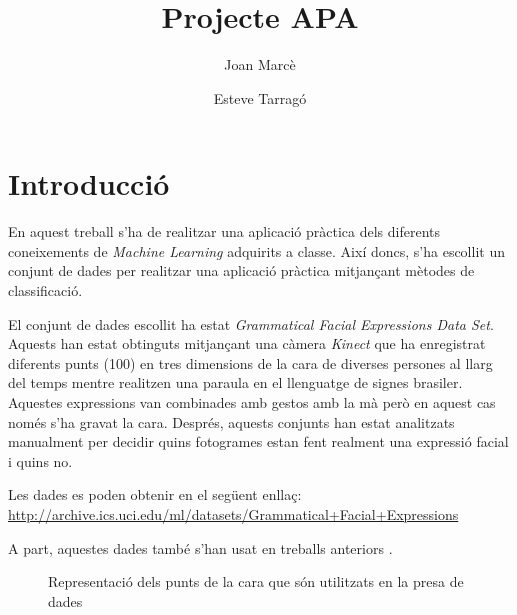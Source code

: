 \documentclass[a4paper]{article}
\title{Projecte APA}
\author{Joan Marcè \and Esteve Tarragó}
\begin{document}
\maketitle
\tableofcontents
\newpage

\section{Introducció}

En aquest treball s'ha de realitzar una aplicació pràctica dels diferents coneixements de \emph{Machine Learning} adquirits a classe. Així doncs, s'ha escollit un conjunt de dades per realitzar una aplicació pràctica mitjançant mètodes de classificació. 

El conjunt de dades escollit ha estat \emph{Grammatical Facial Expressions Data Set}. Aquests han estat obtinguts mitjançant una càmera \emph{Kinect} que ha enregistrat diferents punts (100) en tres dimensions de la cara de diverses persones al llarg del temps mentre realitzen una paraula en el llenguatge de signes brasiler. Aquestes expressions van combinades amb gestos amb la mà però en aquest cas només s'ha gravat la cara. Després, aquests conjunts han estat analitzats manualment per decidir quins fotogrames estan fent realment una expressió facial i quins no. 

Les dades es poden obtenir en el següent enllaç:  \url{http://archive.ics.uci.edu/ml/datasets/Grammatical+Facial+Expressions}

A part, aquestes dades també s'han usat en treballs anteriors \cite{freitas}.

\begin{figure}[H]
	\centering
	\caption{Representació dels punts de la cara que són utilitzats en la presa de dades}
\end{figure}
\end{document}
